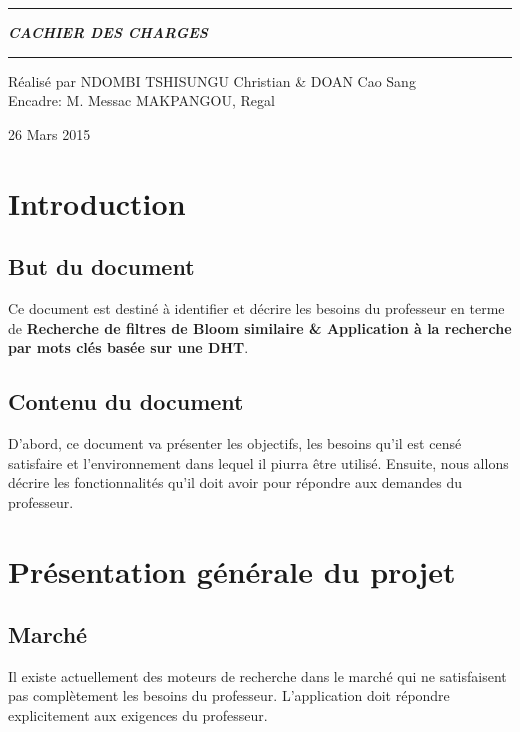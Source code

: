 \documentclass[a4paper,12pt]{report}
\begin{document}
	\begin{titlepage}
		\noindent\rule{\linewidth}{3pt}

		\begin{center}
			\Huge\bfseries\itshape CACHIER DES CHARGES\\
		\end{center}
		
		\noindent\rule{\linewidth}{3pt}
		\begin{center}
			Réalisé par NDOMBI TSHISUNGU Christian \& DOAN Cao Sang \\
			Encadre: M. Messac MAKPANGOU, Regal
		\end{center}
		\begin{center}
			26 Mars 2015
		\end{center}
	\end{titlepage}

\tableofcontents

\chapter{Introduction}
	\section{But du document}
		Ce document est destiné à identifier et décrire les besoins du professeur en terme de \textbf{Recherche de filtres de Bloom similaire \& Application à la recherche par mots clés basée sur une DHT}.

	\section{Contenu du document}
		D'abord, ce document va présenter les objectifs, les besoins qu'il est censé satisfaire et l'environnement dans lequel il piurra être utilisé. Ensuite, nous allons décrire les fonctionnalités qu'il doit avoir pour répondre aux demandes du professeur.

\chapter{Présentation générale du projet}
	\section{Marché}
		Il existe actuellement des moteurs de recherche dans le marché qui ne satisfaisent pas complètement les besoins du professeur. L'application doit répondre explicitement aux exigences du professeur.
		
\end{document}
